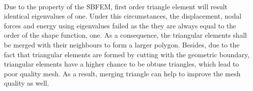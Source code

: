 
\paragraph{}
Due to the property of the SBFEM, first order triangle element will result identical eigenvalues of one.
Under this circumstances, the displacement, nodal forces and energy using eigenvalues failed as the they are always equal to the order of the shape function, one.
As a consequence, the triangular elements shall be merged with their neighbours to form a larger polygon.
Besides, due to the fact that triangular elements are formed by cutting with the geometric boundary, triangular elements have a higher chance to be obtuse triangles, which lead to poor quality mesh.
As a result, merging triangle can help to improve the mesh quality as well.

